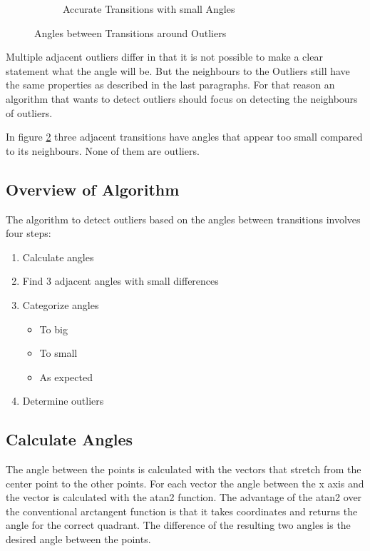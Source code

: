 \begin{figure}[H]
\begin{subfigure}{.33\textwidth}
	\caption{Accurate Transitions  with small Angles}
	\label{fig:nonOutlier}
\end{subfigure}
\caption{Angles between Transitions around Outliers}
\end{figure}

Multiple adjacent outliers differ in that it is not possible to make a clear statement what the angle will be. But the neighbours to the Outliers still have the same properties as described in the last paragraphs. For that reason an algorithm that wants to detect outliers should focus on detecting the neighbours of outliers.

In figure \ref{fig:nonOutlier} three adjacent transitions have angles that appear too small compared to its neighbours. None of them are outliers.

\subsection{Overview of Algorithm}
\label{sec:descriptionOfAngleValidation}

The algorithm to detect outliers based on the angles between transitions involves four steps:

\begin{enumerate}
	\item Calculate angles
	\item Find 3 adjacent angles with small differences
	\item Categorize angles
	\begin{itemize}
		\item To big
		\item To small
		\item As expected 
	\end{itemize}
	\item Determine outliers
\end{enumerate}
\subsection{Calculate Angles}
\label{sec:calculateAngles}
The angle between the points is calculated with the vectors that stretch from the center point to the other points. For each vector the angle between the x axis and the vector is calculated with the atan2 function. The advantage of the atan2 over the conventional arctangent function is that it takes coordinates and returns the angle for the correct quadrant. The difference of the resulting two angles is the desired angle between the points. 

